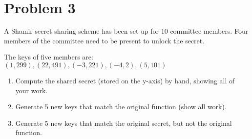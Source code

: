 \documentclass[11pt]{article}
\begin{document}
\section{Problem 3}

A Shamir secret sharing scheme has been set up for 10 committee members. Four members of the committee need to be present to unlock the secret.

The keys of five members are: \((1, 299), (22, 491), (-3, 221), (-4, 2), (5, 101)\)

\begin{enumerate}
    \item Compute the shared secret (stored on the y-axis) by hand, showing all of your work.
    \item Generate 5 new keys that match the original function (show all work).
    \item Generate 5 new keys that match the original secret, but not the original function.
\end{enumerate}
\end{document}
